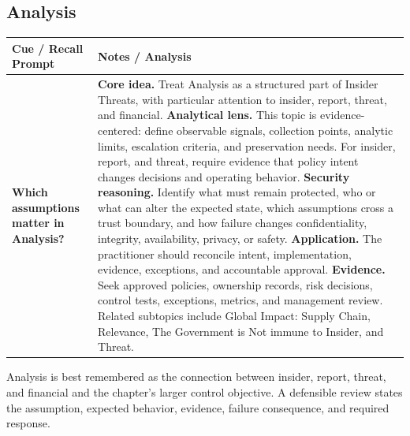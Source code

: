 \documentclass[11pt]{article}
\newcommand{\CornellHeader}{%
\rowcolor{Navy}\color{white}\bfseries Cue / Recall Prompt & \color{white}\bfseries Notes / Analysis\\\hline}
\newcommand{\CornellRow}[2]{%
\cellcolor{CueGray}\RaggedRight\textbf{#1} & \RaggedRight #2\\\hline}
\begin{document}
\subsection*{Analysis}
\begin{longtable}{>{\RaggedRight\arraybackslash}p{}|>{\RaggedRight\arraybackslash}p{}}
\CornellHeader
\CornellRow{Which assumptions matter in Analysis?}{\textbf{Core idea.} Treat Analysis as a structured part of Insider Threats, with particular attention to insider, report, threat, and financial. \textbf{Analytical lens.} This topic is evidence-centered: define observable signals, collection points, analytic limits, escalation criteria, and preservation needs. For insider, report, and threat, require evidence that policy intent changes decisions and operating behavior. \textbf{Security reasoning.} Identify what must remain protected, who or what can alter the expected state, which assumptions cross a trust boundary, and how failure changes confidentiality, integrity, availability, privacy, or safety. \textbf{Application.} The practitioner should reconcile intent, implementation, evidence, exceptions, and accountable approval. \textbf{Evidence.} Seek approved policies, ownership records, risk decisions, control tests, exceptions, metrics, and management review. Related subtopics include Global Impact: Supply Chain, Relevance, The Government is Not immune to Insider, and Threat.}
\end{longtable}
\begin{topicsummary}
Analysis is best remembered as the connection between insider, report, threat, and financial and the chapter's larger control objective. A defensible review states the assumption, expected behavior, evidence, failure consequence, and required response.
\end{topicsummary}
\end{document}
